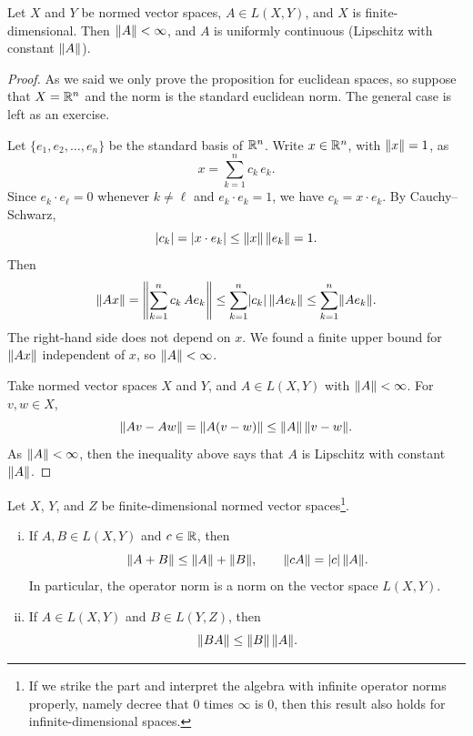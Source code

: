 \begin{prop} \label{prop:finitedimpropnormfin}
Let $X$ and $Y$ be normed vector spaces, $A \in L(X,Y)$, and
$X$ is finite-dimensional.
Then $\lVert {A} \rVert < \infty$, and
$A$ is uniformly continuous (Lipschitz with constant $\lVert {A} \rVert$).
\end{prop}

\begin{proof}
As we said we only prove the proposition for euclidean spaces, so suppose
that $X = {\mathbb{R}}^n$ and the norm is the standard euclidean norm.
The general case is left as an exercise.

Let $\{ e_1,e_2,\ldots,e_n \}$ be the standard basis of ${\mathbb{R}}^n$.
Write $x \in {\mathbb{R}}^n$, with $\lVert {x} \rVert = 1$, as
\begin{equation*}
x = \sum_{k=1}^n c_k \, e_k .
\end{equation*}
Since $e_k \cdot e_\ell = 0$ whenever $k\not=\ell$ and $e_k \cdot e_k = 1$,
we have $c_k = x \cdot e_k$.  By Cauchy--Schwarz,
\begin{equation*}
\lvert {c_k} \rvert = \lvert { x \cdot e_k } \rvert
\leq \lVert {x} \rVert \, \lVert {e_k} \rVert = 1 .
\end{equation*}
Then
\begin{equation*}
\lVert {Ax} \rVert =
\left\lVert {\sum_{k=1}^n c_k \, Ae_k} \right\rVert
\leq
\sum_{k=1}^n \lvert {c_k} \rvert \, \lVert {Ae_k} \rVert 
\leq
\sum_{k=1}^n \lVert {Ae_k} \rVert .
\end{equation*}
The right-hand side does not depend on $x$.  We found
a finite upper bound for $\lVert {Ax} \rVert$ independent of $x$, so $\lVert {A} \rVert < \infty$.

Take normed vector spaces $X$ and $Y$, and $A \in L(X,Y)$ with
$\lVert {A} \rVert < \infty$.
For $v,w \in X$,
\begin{equation*}
\lVert {Av - Aw} \rVert =
\lVert {A(v-w)} \rVert \leq \lVert {A} \rVert \, \lVert {v-w} \rVert .
\end{equation*}
As $\lVert {A} \rVert < \infty$, then the inequality above says that
$A$ is Lipschitz with constant $\lVert {A} \rVert$.
\end{proof}

\begin{prop} \label{prop:finitedimpropnorm}
\pagebreak[3]
Let $X$, $Y$, and $Z$ be finite-dimensional normed vector
spaces\footnote{If we strike the  part and interpret the
algebra with infinite operator norms properly, namely decree that $0$ times
$\infty$ is 0, then this result also holds for infinite-dimensional spaces.}.
\begin{enumerate}[(i)]
\item \label{item:finitedimpropnorm:i}
If $A,B \in L(X,Y)$ and $c \in {\mathbb{R}}$, then
\begin{equation*}
\lVert {A+B} \rVert \leq \lVert {A} \rVert+\lVert {B} \rVert, \qquad \lVert {cA} \rVert = \lvert {c} \rvert \, \lVert {A} \rVert .
\end{equation*}
In particular, the operator norm is a norm on the vector space $L(X,Y)$.
\item \label{item:finitedimpropnorm:ii}
If $A \in L(X,Y)$ and $B \in L(Y,Z)$, then
\begin{equation*}
\lVert {BA} \rVert \leq \lVert {B} \rVert \, \lVert {A} \rVert .
\end{equation*}
\end{enumerate}
\end{prop}

